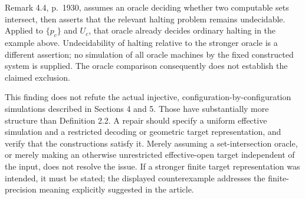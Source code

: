 \documentclass[10pt]{article}
\begin{document}
Remark 4.4, p. 1930, assumes an oracle deciding whether two computable sets intersect, then asserts that the relevant halting problem remains undecidable. Applied to \(\{p_c\}\) and \(U_c\), that oracle already decides ordinary halting in the example above. Undecidability of halting relative to the stronger oracle is a different assertion; no simulation of all oracle machines by the fixed constructed system is supplied. The oracle comparison consequently does not establish the claimed exclusion.\par
This finding does not refute the actual injective, configuration-by-configuration simulations described in Sections 4 and 5. Those have substantially more structure than Definition 2.2. A repair should specify a uniform effective simulation and a restricted decoding or geometric target representation, and verify that the constructions satisfy it. Merely assuming a set-intersection oracle, or merely making an otherwise unrestricted effective-open target independent of the input, does not resolve the issue. If a stronger finite target representation was intended, it must be stated; the displayed counterexample addresses the finite-precision meaning explicitly suggested in the article.\par
\end{document}

